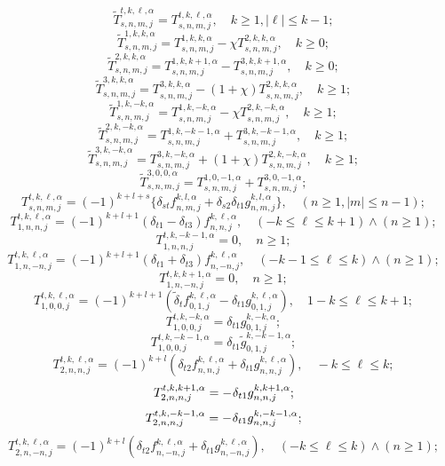\begin{russian}
\begin{theorem}
\begin{equation*}
\tilde T_{s,n,m,j}^{t,k,\ell ,\alpha } = T_{s,n,m,j}^{t,k,\ell ,\alpha },\quad k\ge 1, |\ell|\le k-1;
\end{equation*}
\begin{equation*}
\tilde T_{s,n,m,j}^{1,k,k,\alpha } = T_{s,n,m,j}^{1,k,k,\alpha } - \chi T_{s,n,m,j}^{2,k,k,\alpha },\quad k\ge 0;
\end{equation*}
\[\tilde T_{s,n,m,j}^{2,k,k,\alpha } = T_{s,n,m,j}^{1,k,k + 1,\alpha } - T_{s,n,m,j}^{3,k,k + 1,\alpha },\quad k\ge 0;\]
\[\tilde T_{s,n,m,j}^{3,k,k,\alpha } = T_{s,n,m,j}^{3,k,k,\alpha } - (1 + \chi )T_{s,n,m,j}^{2,k,k,\alpha },\quad k\ge 1;\]
\[\tilde T_{s,n,m,j}^{1,k, - k,\alpha } = T_{s,n,m,j}^{1,k, - k,\alpha } - \chi T_{s,n,m,j}^{2,k, - k,\alpha },\quad k\ge 1;\]
\[\tilde T_{s,n,m,j}^{2,k, - k,\alpha } = T_{s,n,m,j}^{1,k, - k - 1,\alpha } + T_{s,n,m,j}^{3,k, - k - 1,\alpha },\quad k\ge 1;\]
\[\tilde T_{s,n,m,j}^{3,k, - k,\alpha } = T_{s,n,m,j}^{3,k, - k,\alpha } + (1 + \chi )T_{s,n,m,j}^{2,k, - k,\alpha },\quad k\ge 1;\]
\[\tilde T_{s,n,m,j}^{3,0,0,\alpha } = T_{s,n,m,j}^{1,0, - 1,\alpha } + T_{s,n,m,j}^{3,0, - 1,\alpha };\]
\[T_{s,n,m,j}^{t,k,\ell ,\alpha } = (-1)^{k+l+s}\bigg\{\delta_{st}f_{n,m,j}^{k,l,\alpha}+\delta_{s2}\delta_{t1}g_{n,m,j}^{k,l,\alpha}\bigg\},\quad (n\ge 1, |m|\le n-1);\]
\[T_{1,n,n,j}^{t,k,\ell ,\alpha } = (-1)^{k+l+1}({\delta _{t1}} - {\delta _{t3}}){f}_{n,n,j}^{k,\ell ,\alpha },\quad( - k \le \ell  \le k + 1) \wedge (n \ge 1);\]
\[T_{1,n,n,j}^{t,k, - k - 1,\alpha } = 0,\quad n\ge 1;\]
\[T_{1,n, - n,j}^{t,k,\ell ,\alpha } = (-1)^{k+l+1}({\delta _{t1}} + {\delta _{t3}}){f}_{n, - n,j}^{k,\ell ,\alpha },\quad( - k - 1 \le \ell  \le k) \wedge (n \ge 1);\]
\[T_{1,n,-n,j}^{t,k,k+1,\alpha } = 0,\quad n\ge 1;\]
\[T_{1,0,0,j}^{t,k,\ell ,\alpha } = (-1)^{k+l+1}({\tilde \delta _t}{f}_{0,1,j}^{k,\ell ,\alpha } - {\delta _{t1}}{g}_{0,1,j}^{k,\ell ,\alpha }),\quad 1 - k \le \ell  \le k + 1;\]
\[T_{1,0,0,j}^{t,k, - k,\alpha } = {\delta _{t1}}{g}_{0,1,j}^{k, - k,\alpha };\]
\[T_{1,0,0,j}^{t,k, - k - 1,\alpha } = {\delta _{t1}}{\tilde g}_{0,1,j}^{k, - k - 1,\alpha };\]
\[T_{2,n,n,j}^{t,k,\ell ,\alpha } = (-1)^{k+l}({\delta _{t2}}{f}_{n,n,j}^{k,\ell ,\alpha } + {\delta _{t1}}{g}_{n,n,j}^{k,\ell ,\alpha }),\quad - k \le \ell  \le k;\]
\[T_{2,n,n,j}^{t,k,k+1,\alpha } =  - {\mkern 1mu} {\delta _{t1}}{g}_{n,n,j}^{k,k+1,\alpha };\]
\[T_{2,n,n,j}^{t,k, - k - 1,\alpha } =  - {\mkern 1mu} {\delta _{t1}}{g}_{n,n,j}^{k, - k - 1,\alpha };\]
\[T_{2,n, - n,j}^{t,k,\ell ,\alpha } = (-1)^{k+l}({\delta _{t2}}{f}_{n, - n,j}^{k,\ell ,\alpha } + {\delta _{t1}}{g}_{n, - n,j}^{k,\ell ,\alpha }),\quad (- k \le \ell  \le k) \wedge (n\ge 1);\]

\end{theorem}
\end{russian}
